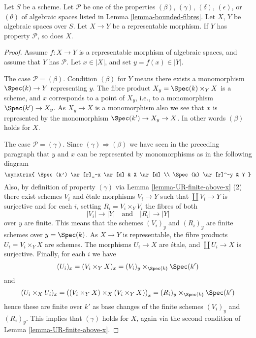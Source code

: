 \begin{lemma}
\label{lemma-representable-properties}
Let $S$ be a scheme. Let $\mathcal{P}$ be one of the properties
$(\beta)$, $(\gamma)$, $(\delta)$, $(\epsilon)$, or
$(\theta)$ of algebraic spaces listed in
Lemma \ref{lemma-bounded-fibres}.
Let $X$, $Y$ be algebraic spaces over $S$.
Let $X \to Y$ be a representable morphism.
If $Y$ has property $\mathcal{P}$, so does $X$.
\end{lemma}

\begin{proof}
Assume $f : X \to Y$ is a representable morphism of algebraic spaces,
and assume that $Y$ has $\mathcal{P}$. Let $x \in |X|$, and set
$y = f(x) \in |Y|$.

\medskip\noindent
The case $\mathcal{P} = (\beta)$. Condition $(\beta)$ for $Y$ means
there exists a monomorphism $\Spec(k) \to Y$ representing $y$.
The fibre product $X_y = \Spec(k) \times_Y X$ is a scheme, and
$x$ corresponds to a point of $X_y$, i.e., to a monomorphism
$\Spec(k') \to X_y$. As $X_y \to X$ is a monomorphism also we see
that $x$ is represented by the monomorphism $\Spec(k') \to X_y \to X$.
In other words $(\beta)$ holds for $X$.

\medskip\noindent
The case $\mathcal{P} = (\gamma)$. Since $(\gamma) \Rightarrow (\beta)$
we have seen in the preceding paragraph that $y$ and $x$ can be represented
by monomorphisms as in the following diagram
$$
\xymatrix{
\Spec(k') \ar[r]_-x \ar[d] & X \ar[d] \\
\Spec(k) \ar[r]^-y & Y
}
$$
Also, by definition of property $(\gamma)$ via
Lemma \ref{lemma-UR-finite-above-x} (2)
there exist schemes
$V_i$ and \'etale morphisms $V_i \to Y$ such that $\coprod V_i \to Y$
is surjective and for each $i$, setting $R_i = V_i \times_Y V_i$
the fibres of both
$$
|V_i| \longrightarrow |Y|
\quad\text{and}\quad
|R_i| \longrightarrow |Y|
$$
over $y$ are finite. This means that the schemes
$(V_i)_y$ and $(R_i)_y$ are finite schemes over $y = \Spec(k)$.
As $X \to Y$ is representable, the fibre products $U_i = V_i \times_Y X$
are schemes. The morphisms $U_i \to X$ are \'etale, and
$\coprod U_i \to X$ is surjective. Finally, for each $i$ we have
$$
(U_i)_x =
(V_i \times_Y X)_x =
(V_i)_y \times_{\Spec(k)} \Spec(k')
$$
and
$$
(U_i \times_X U_i)_x =
\left((V_i \times_Y X) \times_X (V_i \times_Y X)\right)_x =
(R_i)_y \times_{\Spec(k)} \Spec(k')
$$
hence these are finite over $k'$ as base changes of the finite
schemes $(V_i)_y$ and $(R_i)_y$. This implies that $(\gamma)$ holds for $X$,
again via the second condition of
Lemma \ref{lemma-UR-finite-above-x}.


\end{proof}
